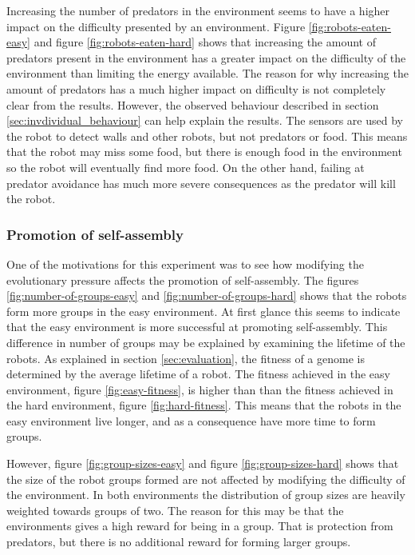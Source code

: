 Increasing the number of predators in the environment seems to have a higher impact on the difficulty presented by an environment.
Figure \ref{fig:robots-eaten-easy} and figure \ref{fig:robots-eaten-hard} shows that increasing the amount of predators present in the environment has a greater impact on the difficulty of the environment than limiting the energy available.
The reason for why increasing the amount of predators has a much higher impact on difficulty is not completely clear from the results.
However, the observed behaviour described in section \ref{sec:invdividual_behaviour} can help explain the results.
The sensors are used by the robot to detect walls and other robots, but not predators or food.
This means that the robot may miss some food, but there is enough food in the environment so the robot will eventually find more food.
On the other hand, failing at predator avoidance has much more severe consequences as the predator will kill the robot.

\subsubsection{Promotion of self-assembly}
One of the motivations for this experiment was to see how modifying the evolutionary pressure affects the promotion of self-assembly.
The figures \ref{fig:number-of-groups-easy} and \ref{fig:number-of-groups-hard} shows that the robots form more groups in the easy environment.
At first glance this seems to indicate that the easy environment is more successful at promoting self-assembly.
This difference in number of groups may be explained by examining the lifetime of the robots.
As explained in section \ref{sec:evaluation}, the fitness of a genome is determined by the average lifetime of a robot.
The fitness achieved in the easy environment, figure \ref{fig:easy-fitness}, is higher than than the fitness achieved in the hard environment, figure \ref{fig:hard-fitness}.
This means that the robots in the easy environment live longer, and as a consequence have more time to form groups.

However, figure \ref{fig:group-sizes-easy} and figure \ref{fig:group-sizes-hard} shows that the size of the robot groups formed are not affected by modifying the difficulty of the environment.
In both environments the distribution of group sizes are heavily weighted towards groups of two.
The reason for this may be that the environments gives a high reward for being in a group.
That is protection from predators, but there is no additional reward for forming larger groups.

